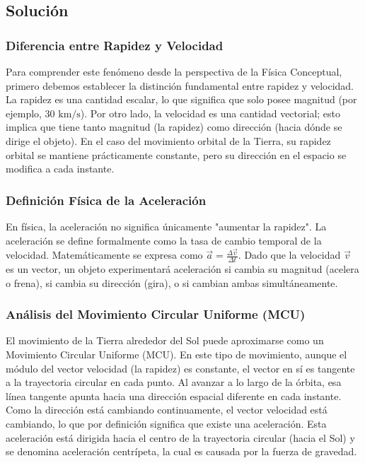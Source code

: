 \documentclass{article}
\begin{document}
\subsection*{Solución}

\subsubsection*{Diferencia entre Rapidez y Velocidad}
Para comprender este fenómeno desde la perspectiva de la Física Conceptual, primero debemos establecer la distinción fundamental entre rapidez y velocidad. La rapidez es una cantidad escalar, lo que significa que solo posee magnitud (por ejemplo, $30 \text{ km/s}$). Por otro lado, la velocidad es una cantidad vectorial; esto implica que tiene tanto magnitud (la rapidez) como dirección (hacia dónde se dirige el objeto). En el caso del movimiento orbital de la Tierra, su rapidez orbital se mantiene prácticamente constante, pero su dirección en el espacio se modifica a cada instante.

\subsubsection*{Definición Física de la Aceleración}
En física, la aceleración no significa únicamente "aumentar la rapidez". La aceleración se define formalmente como la tasa de cambio temporal de la velocidad. Matemáticamente se expresa como $\vec{a} = \frac{\Delta\vec{v}}{\Delta t}$. Dado que la velocidad $\vec{v}$ es un vector, un objeto experimentará aceleración si cambia su magnitud (acelera o frena), si cambia su dirección (gira), o si cambian ambas simultáneamente. 

\subsubsection*{Análisis del Movimiento Circular Uniforme (MCU)}
El movimiento de la Tierra alrededor del Sol puede aproximarse como un Movimiento Circular Uniforme (MCU). En este tipo de movimiento, aunque el módulo del vector velocidad (la rapidez) es constante, el vector en sí es tangente a la trayectoria circular en cada punto. Al avanzar a lo largo de la órbita, esa línea tangente apunta hacia una dirección espacial diferente en cada instante. Como la dirección está cambiando continuamente, el vector velocidad está cambiando, lo que por definición significa que existe una aceleración. Esta aceleración está dirigida hacia el centro de la trayectoria circular (hacia el Sol) y se denomina aceleración centrípeta, la cual es causada por la fuerza de gravedad.
\end{document}
